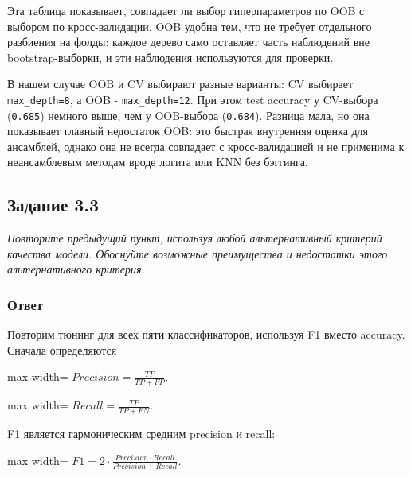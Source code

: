 \documentclass[11pt]{article}
\newenvironment{tasktext}
      {\begin{tcolorbox}[breakable, colback=black!3, colframe=black!28,
        boxrule=0.4pt, arc=1.5mm, left=7pt, right=7pt, top=5pt, bottom=5pt,
        before skip=0.35em, after skip=0.75em]\itshape}
      {\end{tcolorbox}}
\begin{document}
    Эта таблица показывает, совпадает ли выбор гиперпараметров по OOB с
выбором по кросс-валидации. OOB удобна тем, что не требует отдельного
разбиения на фолды: каждое дерево само оставляет часть наблюдений вне
bootstrap-выборки, и эти наблюдения используются для проверки.

В нашем случае OOB и CV выбирают разные варианты: CV выбирает
\texttt{max\_depth=8}, а OOB - \texttt{max\_depth=12}. При этом test
accuracy у CV-выбора (\texttt{0.685}) немного выше, чем у OOB-выбора
(\texttt{0.684}). Разница мала, но она показывает главный недостаток
OOB: это быстрая внутренняя оценка для ансамблей, однако она не всегда
совпадает с кросс-валидацией и не применима к неансамблевым методам
вроде логита или KNN без бэггинга.

    \subsection{Задание 3.3}\label{ux437ux430ux434ux430ux43dux438ux435-3.3}

\begin{tasktext}
Повторите предыдущий пункт, используя любой альтернативный критерий
качества модели. Обоснуйте возможные преимущества и недостатки этого
альтернативного критерия.
\end{tasktext}

\subsubsection{Ответ}

Повторим тюнинг для всех пяти классификаторов, используя F1 вместо
accuracy. Сначала определяются

\begin{center}
\begin{adjustbox}{max width=\linewidth}
\(\displaystyle Precision = \frac{TP}{TP + FP},\)
\end{adjustbox}
\end{center}

\begin{center}
\begin{adjustbox}{max width=\linewidth}
\(\displaystyle Recall = \frac{TP}{TP + FN}.\)
\end{adjustbox}
\end{center}

F1 является гармоническим средним precision и recall:

\begin{center}
\begin{adjustbox}{max width=\linewidth}
\(\displaystyle F1 = 2 \cdot \frac{Precision \cdot Recall}{Precision + Recall}.\)
\end{adjustbox}
\end{center}
\end{document}
